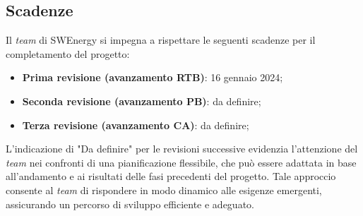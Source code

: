 \subsection{Scadenze}
Il \textit{team} di SWEnergy si impegna a rispettare le seguenti scadenze per il
completamento del progetto:
\begin{itemize}
	\item \textbf{Prima revisione (avanzamento RTB)}: 16 gennaio 2024;
	\item \textbf{Seconda revisione (avanzamento PB)}: da definire;
	\item \textbf{Terza revisione (avanzamento CA)}: da definire;
\end{itemize}

L'indicazione di "Da definire" per le revisioni successive evidenzia l'attenzione
del \textit{team} nei confronti di una pianificazione flessibile, che può essere
adattata in base all'andamento e ai risultati delle fasi precedenti del progetto.
Tale approccio consente al \textit{team} di rispondere in modo dinamico alle esigenze emergenti,
assicurando un percorso di sviluppo efficiente e adeguato.
